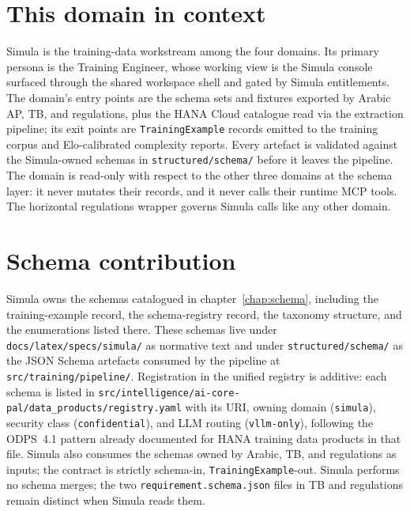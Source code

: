 \documentclass[12pt,a4paper,twoside]{report}
\begin{document}
\section{This domain in context}
\label{sec:agent-domain-context}
Simula is the training-data workstream among the four domains. Its
primary persona is the Training Engineer, whose working view is the
Simula console surfaced through the shared workspace shell and gated
by Simula entitlements. The domain's entry points are the schema
sets and fixtures exported by Arabic AP, TB, and regulations, plus
the HANA Cloud catalogue read via the extraction pipeline; its exit
points are \texttt{TrainingExample} records emitted to the training
corpus and Elo-calibrated complexity reports. Every artefact is
validated against the Simula-owned schemas in
\texttt{structured/schema/} before it leaves the pipeline. The
domain is read-only with respect to the other three domains at the
schema layer: it never mutates their records, and it never calls
their runtime MCP tools. The horizontal regulations wrapper governs
Simula calls like any other domain.

\section{Schema contribution}
\label{sec:agent-schema-contrib}
Simula owns the schemas catalogued in
chapter~\ref{chap:schema}, including the training-example record,
the schema-registry record, the taxonomy structure, and the
enumerations listed there. These schemas live under
\texttt{docs/latex/specs/simula/} as normative text and under
\texttt{structured/schema/} as the JSON Schema artefacts consumed by
the pipeline at \texttt{src/training/pipeline/}. Registration in the
unified registry is additive: each schema is listed in
\texttt{src/intelligence/ai-core-pal/data\_products/registry.yaml}
with its URI, owning domain (\texttt{simula}), security class
(\texttt{confidential}), and LLM routing (\texttt{vllm-only}),
following the ODPS~4.1 pattern already documented for HANA training
data products in that file. Simula also consumes the schemas owned
by Arabic, TB, and regulations as inputs; the contract is strictly
schema-in, \texttt{TrainingExample}-out. Simula performs no schema
merges; the two \texttt{requirement.schema.json} files in TB and
regulations remain distinct when Simula reads them.
\end{document}
